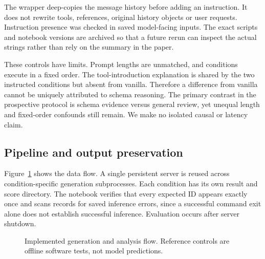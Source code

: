 \documentclass[conference]{IEEEtran}
\begin{document}
The wrapper deep-copies the message history before adding an instruction. It does not rewrite tools, references, original history objects or user requests. Instruction presence was checked in saved model-facing inputs. The exact scripts and notebook versions are archived so that a future rerun can inspect the actual strings rather than rely on the summary in the paper.

These controls have limits. Prompt lengths are unmatched, and conditions execute in a fixed order. The tool-introduction explanation is shared by the two instructed conditions but absent from vanilla. Therefore a difference from vanilla cannot be uniquely attributed to schema reasoning. The primary contrast in the prospective protocol is schema evidence versus general review, yet unequal length and fixed-order confounds still remain. We make no isolated causal or latency claim.

\subsection{Pipeline and output preservation}
Figure~\ref{fig:pipeline} shows the data flow. A single persistent server is reused across condition-specific generation subprocesses. Each condition has its own result and score directory. The notebook verifies that every expected ID appears exactly once and scans records for saved inference errors, since a successful command exit alone does not establish successful inference. Evaluation occurs after server shutdown.

\begin{figure}[t]\centering
{}
\caption{Implemented generation and analysis flow. Reference controls are offline software tests, not model predictions.}\label{fig:pipeline}
\end{figure}
\end{document}
